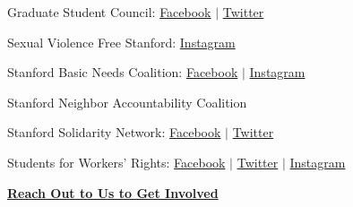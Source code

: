 \documentclass[12pt, titlepage, letterpaper]{article}
\begin{document}
Graduate Student Council: \href{https://www.facebook.com/gsc.stanford/}{Facebook} $\vert$ \href{https://twitter.com/StanfordGSC}{Twitter}

Sexual Violence Free Stanford: \href{https://www.instagram.com/svfreestanford/}{Instagram}

Stanford Basic Needs Coalition: \href{https://www.facebook.com/basicNeedsAtStanford}{Facebook} $\vert$ \href{https://www.instagram.com/basicneedsatstanford/}{Instagram}

Stanford Neighbor Accountability Coalition

Stanford Solidarity Network: \href{https://www.facebook.com/stanfordsolidaritynetwork}{Facebook} $\vert$ \href{https://twitter.com/solidarityntwrk}{Twitter}

Students for Workers’ Rights: \href{https://www.facebook.com/StanfordSWR}{Facebook} $\vert$ \href{https://twitter.com/stanford_swr}{Twitter} $\vert$ \href{https://www.instagram.com/stanfordswr/}{Instagram}

\vspace*{1.5em}
\begin{center}
\href{https://docs.google.com/forms/d/e/1FAIpQLSfSbbNOngWJa3JpLRSug4KqUhRjWr414RARM9sXy5XbCNuAcg/viewform}{\Large\textbf{Reach Out to Us to Get Involved}}
\end{center}
\end{document}
